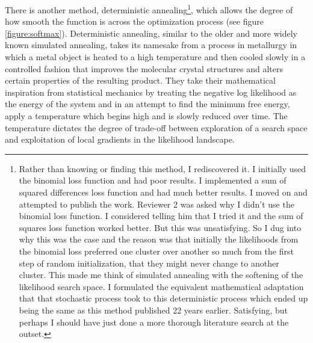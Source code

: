 \par{
There is another method, deterministic annealing\footnote{Rather than knowing or finding this method, I rediscovered it. I initially used the binomial loss function and had poor results. I implemented a sum of squared differences loss function and had much better results. I moved on and attempted to publish the work. Reviewer 2 was asked why I didn't use the binomial loss function. I considered telling him that I tried it and the sum of squares loss function worked better. But this was unsatisfying. So I dug into why this was the case and the reason was that initially the likelihoods from the binomial loss preferred one cluster over another so much from the first step of random initialization, that they might never change to another cluster. This made me think of simulated annealing with the softening of the likelihood search space. I formulated the equivalent mathematical adaptation that that stochastic process took to this deterministic process which ended up being the same as this method published 22 years earlier. Satisfying, but perhaps I should have just done a more thorough literature search at the outset. }, which allows the degree of how smooth the function is across the optimization process\cite{annealing}\cite{annealing2} (see figure \ref{figure:softmax}). Deterministic annealing, similar to the older and more widely known simulated annealing\cite{simannealing}, takes its namesake from a process in metallurgy in which a metal object is heated to a high temperature and then cooled slowly in a controlled fashion that improves the molecular crystal structures and alters certain properties of the resulting product. They take their mathematical inspiration from statistical mechanics by treating the negative log likelihood as the energy of the system and in an attempt to find the minimum free energy, apply a temperature which begins high and is slowly reduced over time. The temperature dictates the degree of trade-off between exploration of a search space and exploitation of local gradients in the likelihood landscape. }

